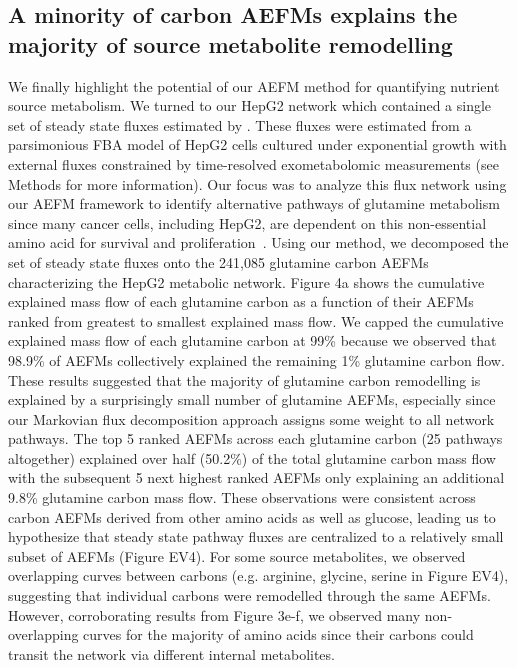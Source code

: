 \documentclass[12pt]{article}
\begin{document}
\subsection*{A minority of carbon AEFMs explains the majority of source metabolite remodelling}


We finally highlight the potential of our AEFM method for quantifying
nutrient source metabolism. We turned to our HepG2 network which contained
a single set of steady state fluxes estimated by
\citeauthor{NilssonAvlant2020Qaoa}. These fluxes were estimated from
a parsimonious FBA model of HepG2 cells cultured under exponential growth
with external fluxes constrained by time-resolved exometabolomic
measurements (see Methods for more information). Our focus was to analyze
this flux network using our AEFM framework to identify alternative
pathways of glutamine metabolism since many cancer cells, including HepG2,
are dependent on this non-essential amino acid for survival and
proliferation~\citep{YeYanyan2023Gmri,YooHeeChan2020Gric}. Using our
method, we decomposed the set of steady state fluxes onto the 241,085
glutamine carbon AEFMs characterizing the HepG2 metabolic network. Figure
4a shows the cumulative explained mass flow of each glutamine carbon as
a function of their AEFMs ranked from greatest to smallest explained mass
flow. We capped the cumulative explained mass flow of each glutamine
carbon at 99\% because we observed that 98.9\% of AEFMs collectively
explained the remaining 1\% glutamine carbon flow. These results suggested
that the majority of glutamine carbon remodelling is explained by
a surprisingly small number of glutamine AEFMs, especially since our
Markovian flux decomposition approach assigns some weight to all network
pathways. The top 5 ranked AEFMs across each glutamine carbon (25 pathways
altogether) explained over half (50.2\%) of the total glutamine carbon
mass flow with the subsequent 5 next highest ranked AEFMs only explaining
an additional 9.8\% glutamine carbon mass flow. These observations were
consistent across carbon AEFMs derived from other amino acids as well as
glucose, leading us to hypothesize that steady state pathway fluxes are
centralized to a relatively small subset of AEFMs (Figure EV4). For some
source metabolites, we observed overlapping curves between carbons (e.g.
arginine, glycine, serine in Figure EV4), suggesting that individual
carbons were remodelled through the same AEFMs. However, corroborating
results from Figure 3e-f, we observed many non-overlapping curves for the
majority of amino acids since their carbons could transit the network via
different internal metabolites.
\end{document}
